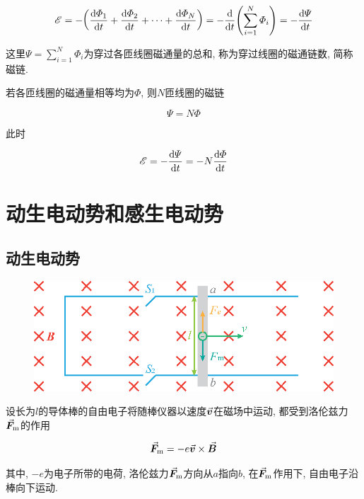 \begin{equation}
	\mathscr{E} = - \qty(\dv{\varPhi_1}{t} + \dv{\varPhi_2}{t} + \cdots + \dv{\varPhi_N}{t}) = - \dv{t} \qty(\sum\limits_{i = 1}^{N} \varPhi_i) = - \dv{\varPsi}{t} \label{C9-eq2}
\end{equation}

这里$\varPsi = \sum\limits_{i = 1}^{N} \varPhi_i$为穿过各匝线圈磁通量的总和, 称为穿过线圈的磁通链数, 简称磁链. 

若各匝线圈的磁通量相等均为$\varPhi$, 则$N$匝线圈的磁链

\begin{equation}
	\varPsi = N \varPhi \label{C9-eq3}
\end{equation}

此时

\begin{equation}
	\mathscr{E} = -\dv{\varPsi}{t} = -N\dv{\varPhi}{t} \label{C9-eq4}
\end{equation}

\section{动生电动势和感生电动势}\label{9.2}

\subsection{动生电动势}

\begin{figure}[H]
	\centering
	\includegraphics[scale=0.9]{C9-fig1.eps}
\end{figure}

设长为$l$的导体棒的自由电子将随棒仪器以速度$\va*{v}$在磁场中运动, 都受到洛伦兹力$\va*{F}_{\textrm{m}}$的作用

\begin{equation*}
	\va*{F}_{\textrm{m}} = -e \va*{v} \times \va*{B}
\end{equation*}

其中, $-e$为电子所带的电荷, 洛伦兹力$\va*{F}_{\textrm{m}}$方向从$a$指向$b$, 在$\va*{F}_{\textrm{m}}$作用下, 自由电子沿棒向下运动. 

